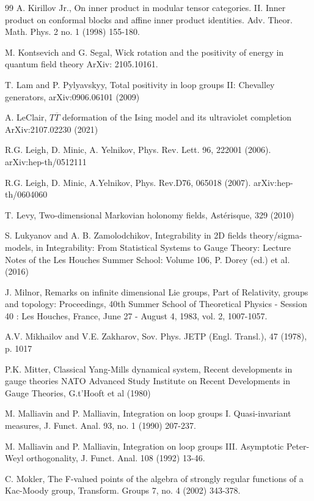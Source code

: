 \documentclass{amsart}
\theoremstyle{conjecture}
\theoremstyle{definition}
\theoremstyle{question}
\theoremstyle{questions}
\theoremstyle{remark}
\theoremstyle{remarks}
\theoremstyle{example}
\numberwithin{equation}{section}
\begin{document}
\begin{thebibliography}{99}
 A. Kirillov Jr.,  On inner product in modular tensor categories. II.
Inner product on conformal blocks and affine inner product identities.
Adv. Theor. Math. Phys. 2 no. 1 (1998) 155-180.

 M. Kontsevich and G. Segal, Wick rotation and the positivity of energy in quantum field theory
ArXiv: 2105.10161.

T. Lam and P. Pylyavskyy, Total positivity in loop groups II: Chevalley generators,
arXiv:0906.06101 (2009)

 A. LeClair, $T\overline T$ deformation of the Ising model and its ultraviolet completion
ArXiv:2107.02230 (2021)

 R.G. Leigh, D. Minic, A. Yelnikov, Phys. Rev. Lett. 96, 222001
(2006). arXiv:hep-th/0512111

  R.G. Leigh, D. Minic, A.Yelnikov, Phys. Rev.D76, 065018 (2007).
arXiv:hep-th/0604060

 T. Levy, Two-dimensional Markovian holonomy fields, Astérisque, 329 (2010)


S. Lukyanov and A. B. Zamolodchikov, Integrability in 2D fields theory/sigma-models, in
Integrability: From Statistical Systems to Gauge Theory: Lecture Notes of the Les Houches
Summer School: Volume 106, P. Dorey (ed.) et al. (2016)


 J. Milnor, Remarks on infinite dimensional Lie groups,
Part of Relativity, groups and topology: Proceedings, 40th Summer School of Theoretical Physics - Session 40 : Les Houches, France, June 27 - August 4, 1983, vol. 2, 1007-1057.

 A.V. Mikhailov and V.E. Zakharov,
Sov. Phys. JETP (Engl. Transl.), 47 (1978), p. 1017

P.K. Mitter, Classical Yang-Mills dynamical system, Recent developments in gauge theories
NATO Advanced Study Institute on Recent Developments in Gauge Theories, G.t'Hooft et al (1980)

M. Malliavin and P. Malliavin, Integration on loop
groups I. Quasi-invariant measures, J. Funct. Anal.
93, no. 1 (1990) 207-237.

M. Malliavin and P. Malliavin, Integration on loop
groups III. Asymptotic Peter-Weyl orthogonality, J. Funct. Anal.
108 (1992) 13-46.

 C. Mokler, The F-valued points of the algebra of
strongly regular functions of a Kac-Moody group,
Transform. Groups 7, no. 4 (2002) 343-378.


\end{thebibliography}
\end{document}
